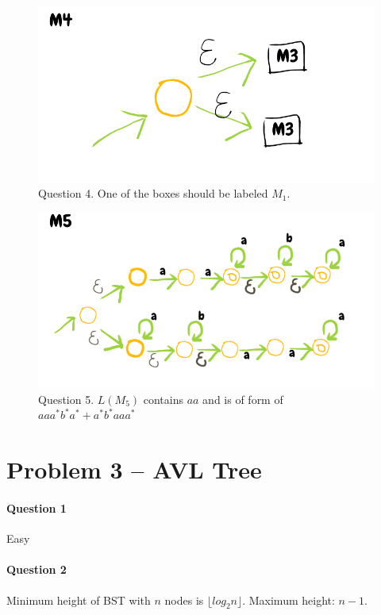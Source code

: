 \begin{figure}[!h]
    \centering
    \includegraphics[scale=0.5]{data/2016-W-2-4.png}
    \caption{Question 4. One of the boxes should be labeled $M_1$.}
       \label{fig:w2016-w-2-4}
\end{figure}

\begin{figure}[!h]
    \centering
    \includegraphics[scale=0.5]{data/2016-W-2-5.png}
    \caption{Question 5. $L(M_5)$ contains $aa$ and is of form of $aaa^* b^* a^* + a^* b^* aaa^*$}
       \label{fig:w2016-w-2-5}
\end{figure}



\section{Problem 3 – AVL Tree}

\paragraph{Question 1}
Easy  %

\paragraph{Question 2}
Minimum height of BST with $n$ nodes is $\lfloor log_2n\rfloor$.
Maximum height: $n-1$.


